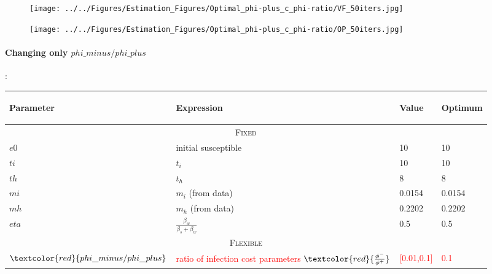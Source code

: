 \documentclass{../cls/NotesV2_Class}
\begin{document}
\begin{figure}[htbp!]
\texttt{[image: ../../Figures/Estimation\_Figures/Optimal\_phi-plus\_c\_phi-ratio/VF\_50iters.jpg]}
\end{figure}

\begin{figure}[htbp!]
\texttt{[image: ../../Figures/Estimation\_Figures/Optimal\_phi-plus\_c\_phi-ratio/OP\_50iters.jpg]}
\end{figure}

\newpage
\paragraph{Changing only $phi\_minus/phi\_plus$}:


\begin{center}
\begin{tabular}[h]{ |p{3cm}||p{6cm}|p{2cm}|p{2cm}|  }
 \hline
 \begin{center}Parameter\end{center} & \begin{center}Expression\end{center} & \begin{center}Value\end{center} & \begin{center}Optimum\end{center} \\
 \hline
 \hline
 \multicolumn{4}{|c|}{\textsc{Fixed}} \\
 \hline
 $e0$   &  initial susceptible  & 10 & 10\\
 $ti$ & $t_i$ & 10 & 10 \\
 $th$ & $t_h$ & 8 & 8\\
 $mi$ & $m_i$ (from data) & 0.0154 & 0.0154 \\
 $mh$ & $m_h$ (from data) & 0.2202 & 0.2202\\
 $eta$ & $\frac{\beta_w}{\beta_s+\beta_w}$ & 0.5 & 0.5 \\
 \hline
 \multicolumn{4}{|c|}{\textsc{Flexible}} \\
 \hline
$\textcolor{red}{phi\_minus/phi\_plus}$ & \textcolor{red}{ratio of infection cost parameters} $\textcolor{red}{\frac{\phi^-}{\phi^+}}$ & \textcolor{red}{[0.01,0.1]} & \textcolor{red}{0.1} \\

\end{tabular}
\end{center}
\end{document}
